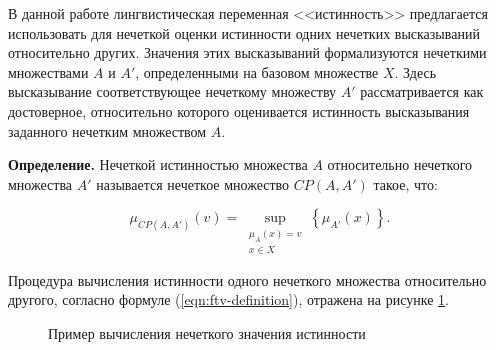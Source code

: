 В данной работе лингвистическая переменная <<истинность>> предлагается использовать для нечеткой оценки истинности одних нечетких высказываний относительно других. Значения этих высказываний формализуются нечеткими множествами $A$ и $A'$, определенными на базовом множестве $X$. Здесь высказывание соответствующее нечеткому множеству $A'$ рассматривается как достоверное, относительно которого оценивается истинность высказывания заданного нечетким множеством $A$.

\textbf{Определение.} Нечеткой истинностью множества $A$ относительно нечеткого множества $A'$ называется нечеткое множество $CP(A,A')$ \cite{Dubois2012} такое, что:

\begin{equation}
	\label{eqn:ftv-definition}
	\mu_{CP(A, A')}(v) = \sup_{\substack{\mu_{A}(x) = v \\ x \in X}}\left\{\mu_{A'}(x)\right\}.
\end{equation}

Процедура вычисления истинности одного нечеткого множества относительно другого, согласно формуле (\ref{eqn:ftv-definition}), отражена на рисунке \cref{fig:ftv-computation}.

\begin{figure}[ht]
	\centering
	\caption{Пример вычисления нечеткого значения истинности}
	\label{fig:ftv-computation}
\end{figure}

